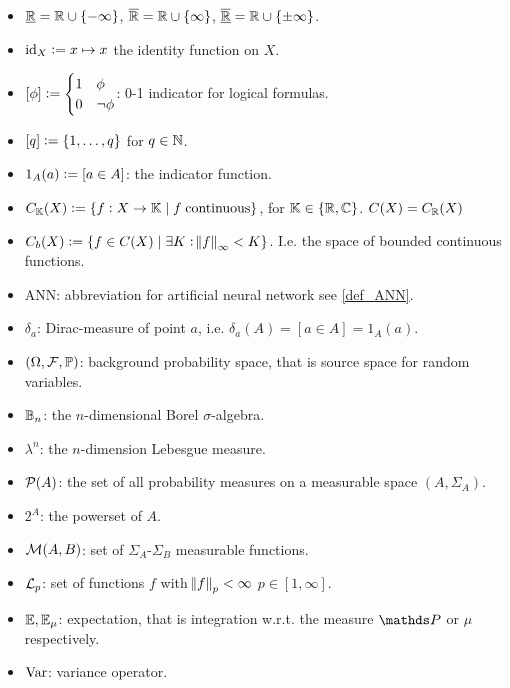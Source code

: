 
\begin{itemize}
  \item $\underline{\mathbb{R}} = \mathbb{R} \cup \{-\infty\}$, $\overline{\mathbb{R}} = \mathbb{R} \cup \{\infty\}$,
    $\overline{\underline{\mathbb{R}}} = \mathbb{R} \cup \{\pm \infty\}$.
  \item $\text{id}_X \vcentcolon= x \mapsto x$ the identity function on $X$.
  \item $ [\phi] \vcentcolon= \begin{cases}
    1 & \phi \\ 0 & \neg \phi \end{cases}$: 0-1 indicator for logical formulas.
  \item $[q] \vcentcolon= \{1,\dots,q\}$ for $q\in \mathbb{N}$.
  \item $1_A(a) \vcentcolon= [a \in A]$: the indicator function.
  \item $C_{\mathbb{K}}(X) \vcentcolon= \{ f : X \to \mathbb{K} \mid f \; \text{continuous} \}$,
    for $\mathbb{K} \in \{ \mathbb{R}, \mathbb{C} \}$. $C(X) = C_\mathbb{R}(X)$
  \item $C_b(X) \vcentcolon= \{ f \in C(X) \mid \exists K : \norm{f}_\infty < K \}$.
    I.e. the space of bounded continuous functions.
  \item ANN: abbreviation for artificial neural network see \cref{def_ANN}.
  \item $\delta_a$: Dirac-measure of point $a$,
    i.e. $\delta_a(A) = [a \in A] = 1_A(a)$.
  \item $(\Omega, \mathcal{F}, \mathbb{P})$: background probability space,
    that is source space for random variables.
  \item $\mathbb{B}_n$: the $n$-dimensional Borel $\sigma$-algebra.
  \item $\lambda^n$: the $n$-dimension Lebesgue measure.
  \item $\mathcal{P}(A)$: the set of all probability measures on a
    measurable space $(A, \Sigma_A)$.
  \item $2^A$: the powerset of $A$.
  \item $\mathcal{M}(A, B)$: set of $\Sigma_A$-$\Sigma_B$ measurable functions.
  \item $\mathcal{L}_p$: set of functions $f$ with $\norm{f}_p < \infty$
    $p \in [1,\infty]$.
  \item $\mathbb{E}, \mathbb{E}_\mu$: expectation, that is integration
    w.r.t. the measure $\Prob$ or $\mu$ respectively.
  \item $\mathrm{Var}$: variance operator.
\end{itemize}
